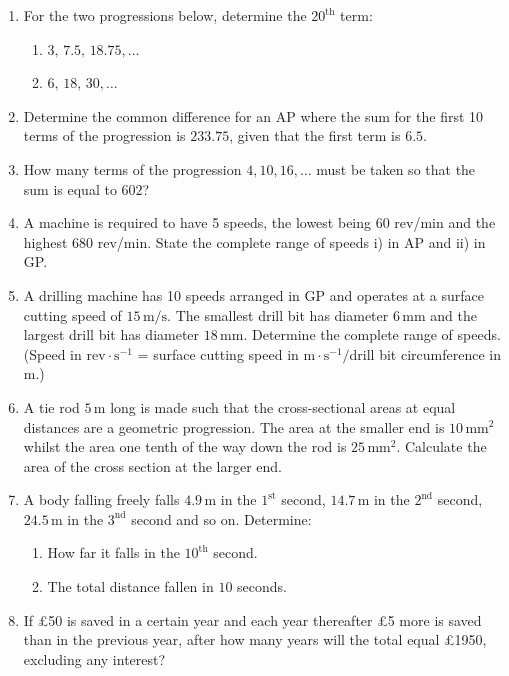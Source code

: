 \documentclass[
  english,
  12pt,
  oneside]{book}
\providecommand{\tightlist}{%
  \setlength{\itemsep}{0pt}\setlength{\parskip}{0pt}}
\theoremstyle{definition}
\theoremstyle{definition}
\theoremstyle{definition}
\theoremstyle{definition}
\theoremstyle{remark}
\begin{document}
\begin{enumerate}
\def\labelenumi{\arabic{enumi}.}
\item
  For the two progressions below, determine the \(20^{\mathrm{th}}\) term:

  \begin{enumerate}
  \def\labelenumii{\roman{enumii})}
  \tightlist
  \item
    \(3,\,7.5,\,18.75,\dots\)
  \item
    \(6,\,18,\,30,\dots\)
  \end{enumerate}
\item
  Determine the common difference for an AP where the sum for the first 10 terms of the progression is \(233.75\), given that the first term is \(6.5\).
\item
  How many terms of the progression \(4,10,16,\dots\) must be taken so that the sum is equal to \(602\)?
\item
  A machine is required to have 5 speeds, the lowest being 60 rev/min and the highest 680 rev/min. State the complete range of speeds i) in AP and ii) in GP.
\item
  A drilling machine has 10 speeds arranged in GP and operates at a surface cutting speed of \(15\,\mathrm{m/s}\). The smallest drill bit has diameter \(6\,\mathrm{mm}\) and the largest drill bit has diameter \(18\,\mathrm{mm}\). Determine the complete range of speeds. (Speed in \(\mathrm{rev}\cdot\mathrm{s}^{-1}\) = surface cutting speed in \(\mathrm{m}\cdot\mathrm{s}^{-1}/\)drill bit circumference in \(\mathrm{m}\).)
\item
  A tie rod \(5\,\mathrm{m}\) long is made such that the cross-sectional areas at equal distances are a geometric progression. The area at the smaller end is \(10\,\mathrm{mm}^2\) whilst the area one tenth of the way down the rod is \(25\,\mathrm{mm}^2\). Calculate the area of the cross section at the larger end.
\item
  A body falling freely falls \(4.9\,\mathrm{m}\) in the \(1^{\mathrm{st}}\) second, \(14.7\,\mathrm{m}\) in the \(2^{\mathrm{nd}}\) second, \(24.5\,\mathrm{m}\) in the \(3^{\mathrm{nd}}\) second and so on. Determine:

  \begin{enumerate}
  \def\labelenumii{\alph{enumii})}
  \tightlist
  \item
    How far it falls in the \(10^{\mathrm{th}}\) second.
  \item
    The total distance fallen in \(10\) seconds.
  \end{enumerate}
\item
  If £50 is saved in a certain year and each year thereafter £5 more is saved than in the previous year, after how many years will the total equal £1950, excluding any interest?
\end{enumerate}
\end{document}
